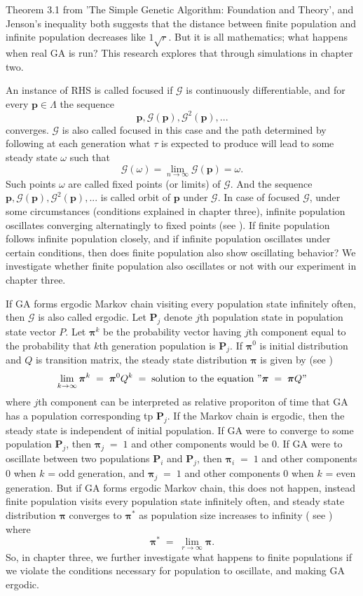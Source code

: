 Theorem 3.1 from 'The Simple Genetic Algorithm: Foundation and Theory', 
and Jenson's inequality both suggests that the distance between finite population and infinite population decreases like  
$1\sqrt{r}$. But it is all mathematics; what happens when real GA is run? This research explores that 
through simulations in chapter two.

An instance of RHS is called focused if $\mathcal{G}$ is continuously differentiable, and for every $\bm{p}  \in  \Lambda$
the sequence
\[
\bm{p},  \mathcal{G}(\bm{p}),  {\mathcal{G}}^2(\bm{p}),...
\]
converges. $\mathcal{G}$ is also called focused in this case and the path determined by following at each generation what $\tau$ is expected 
to produce will lead to some steady state $\omega$ such that
\[
\mathcal{G}(\omega) = \lim_{n\to\infty} \mathcal{G}(\bm{p}) = \omega.
\]
Such points $\omega$ are called fixed points (or limits) of $\mathcal{G}$. 
And the sequence $\bm{p},  \mathcal{G}(\bm{p}),  {\mathcal{G}}^2(\bm{p}),...$ is called orbit of $\bm{p}$ under $\mathcal{G}$. 
In case of focused $\mathcal{G}$, under some circumstances (conditions explained in chapter three), 
infinite population oscillates converging alternatingly to fixed points (see \cite{Vose1999}). 
If finite population follows infinite population closely, and if infinite population oscillates under certain conditions, then 
does finite population also show oscillating behavior? We investigate whether finite population also oscillates or not with our experiment 
in chapter three. 

If GA forms ergodic Markov chain visiting every population state infinitely often, then $\mathcal{G}$ is also called ergodic. 
Let $\bm{P}_j$ denote $j$th population state in population state vector $P$. Let $\bm{\pi}^k$ be the probability vector having $j$th component 
equal to the probability that $k$th generation population is $\bm{P}_j$. If $\bm{\pi}^0$ is initial distribution and $Q$ is transition matrix, the steady state distribution $\bm{\pi}$ is given by (see \cite{Nix1992})
\[
\lim_{k \to \infty} \bm{\pi}^k \;=\; \bm{\pi}^0 Q^k \;=\; \text{solution to the equation } "\bm{\pi} \; = \; \bm{\pi} Q" 
\]
where $j$th component can be interpreted as relative proporiton of time that GA has a population corresponding tp $\bm{P}_j$. 
If the Markov chain is ergodic, then the steady state is independent of initial population. If GA were to converge to some population $\bm{P}_j$, 
then $\bm{\pi}_j \;=\; 1$ and other components would be $0$. If GA were to oscillate between two populations $\bm{P}_i$ and $\bm{P}_j$, then 
$\bm{\pi}_i \;=\; 1$ and other components $0$ when $k$ = odd generation, and $\bm{\pi}_j \;=\; 1$ and other components $0$ when $k$ = even generation. 
But if GA forms ergodic Markov chain, this does not happen, instead finite population visits every population state infinitely often, and steady state 
distribution $\bm{\pi}$ converges to $\bm{\pi}^\ast$ as population size increases to infinity ( see \cite{Nix1992}) where 
\[
\bm{\pi}^\ast \;=\; \lim_{r \to \infty} \bm{\pi}.
\]
So, in chapter three, we further investigate what happens to finite populations 
if we violate the conditions necessary for population to oscillate, and making GA ergodic.



